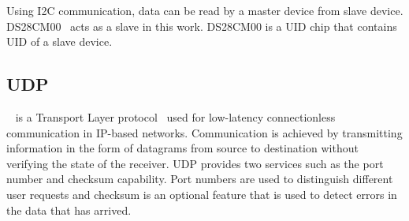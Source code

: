Using \acrshort{I2C} communication, data can be read by a master device from slave device.
DS28CM00~\cite{Maxim-DS28CM00-2006a} acts as a slave in this work.
DS28CM00 is a \acrshort{UID} chip that contains \acrshort{UID} of a slave device.

\subsection{UDP}\label{sec:UDP}
~\cite{Tanenbaum2010} is a Transport Layer protocol~\cite{Day1983} used for low-latency connectionless communication in IP-based networks. Communication is achieved by transmitting information in the form of datagrams from source to destination without verifying the state of the receiver. 
UDP provides two services such as the port number and checksum capability. 
Port numbers are used to distinguish different user requests and checksum is an optional feature that is used to detect errors in the data that has arrived. 

